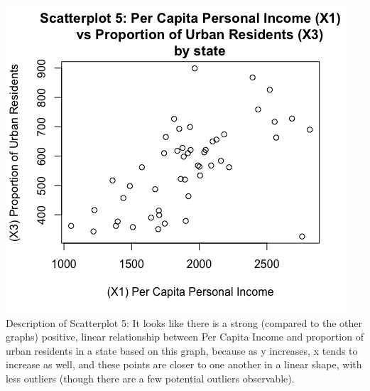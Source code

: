 \documentclass[12pt,letterpaper]{article}
\begin{document}
\begin{itemize}
		\begin{center}
		\includegraphics[scale=.80]{Scatterplot5.png}
		Description of Scatterplot 5: It looks like there is a strong (compared to the other graphs) positive, linear relationship between Per Capita Income and proportion of urban residents in a state based on this graph, because as y increases, x tends to increase as well, and these points are closer to one another in a linear shape, with less outliers (though there are a few potential outliers observable).
		\end{center}
	
		\newpage	
		 
		

\end{itemize}
\end{document}
